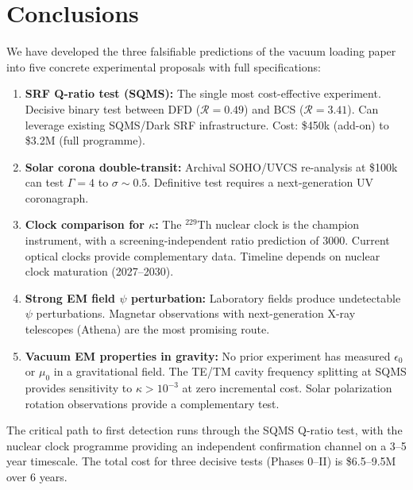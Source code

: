 \documentclass[11pt]{article}
\begin{document}
\section{Conclusions}
\label{sec:conclusions}

We have developed the three falsifiable predictions of the vacuum
loading paper into five concrete experimental proposals with full
specifications:

\begin{enumerate}
\item \textbf{SRF Q-ratio test (SQMS):}  The single most
cost-effective experiment.  Decisive binary test between DFD
($\mathcal{R} = 0.49$) and BCS ($\mathcal{R} = 3.41$).  Can
leverage existing SQMS/Dark SRF infrastructure.  Cost: \$450k
(add-on) to \$3.2M (full programme).

\item \textbf{Solar corona double-transit:}  Archival SOHO/UVCS
re-analysis at \$100k can test $\Gamma = 4$ to $\sigma \sim 0.5$.
Definitive test requires a next-generation UV coronagraph.

\item \textbf{Clock comparison for $\kappa$:}  The $^{229}$Th
nuclear clock is the champion instrument, with a screening-independent
ratio prediction of 3000.  Current optical clocks provide
complementary data.  Timeline depends on nuclear clock maturation
(2027--2030).

\item \textbf{Strong EM field $\psi$ perturbation:}  Laboratory
fields produce undetectable $\psi$ perturbations.  Magnetar
observations with next-generation X-ray telescopes (Athena) are
the most promising route.

\item \textbf{Vacuum EM properties in gravity:}  No prior experiment
has measured $\epsilon_0$ or $\mu_0$ in a gravitational field.  The
TE/TM cavity frequency splitting at SQMS provides sensitivity to
$\kappa > 10^{-3}$ at zero incremental cost.  Solar polarization
rotation observations provide a complementary test.
\end{enumerate}

The critical path to first detection runs through the SQMS Q-ratio
test, with the nuclear clock programme providing an independent
confirmation channel on a 3--5 year timescale.  The total cost for
three decisive tests (Phases 0--II) is \$6.5--9.5M over 6 years.
\end{document}
